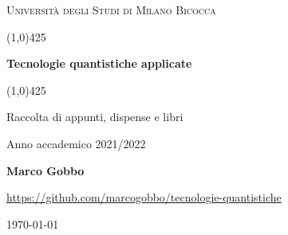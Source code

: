 \documentclass[a4paper, 12pt]{book}
\begin{document}
    \begin{titlepage}
        \begin{center}
            \vspace*{5cm}
            {\scshape\LARGE Università degli Studi di Milano Bicocca \par}
            \vspace{1.0cm}
            \line(1,0){425} \\
            {\huge\bfseries Tecnologie quantistiche applicate \par}
            \line(1,0){425} \\
 	        \vspace{0.5cm}
            {\Large Raccolta di appunti, dispense e libri \par}
            \vspace{1.0cm}
            {Anno accademico 2021/2022 \par}
            \vspace{0.5cm}
            {\bfseries Marco Gobbo \par}
            \vspace{0.5cm}
            {\url{https://github.com/marcogobbo/tecnologie-quantistiche} \par}
            \vspace*{\fill}
            {\large \today \par}
        \end{center}
    \end{titlepage}
    \tableofcontents
    
\end{document}

